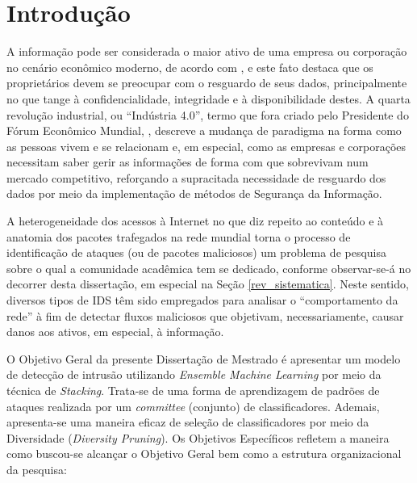 \chapter{Introdução}
\label{intro}


A informação pode ser considerada o maior ativo de uma empresa ou corporação no cenário econômico moderno, de acordo com , e este fato destaca que os proprietários devem se preocupar com o resguardo de seus dados, principalmente no que tange à confidencialidade, integridade e à disponibilidade destes. A quarta revolução industrial, ou ``Indústria 4.0'', termo que fora criado pelo Presidente do Fórum Econômico Mundial, , descreve a mudança de paradigma na forma como as pessoas vivem e se relacionam e, em especial, como as empresas e corporações necessitam saber gerir as informações de forma com que sobrevivam num mercado competitivo, reforçando a supracitada necessidade de resguardo dos dados por meio da implementação de métodos de Segurança da Informação. 

A heterogeneidade dos acessos à Internet no que diz repeito ao conteúdo e à anatomia dos pacotes trafegados na rede mundial torna o processo de identificação de ataques (ou de pacotes maliciosos) um problema de pesquisa sobre o qual a comunidade acadêmica tem se dedicado, conforme observar-se-á no decorrer desta dissertação, em especial na Seção \ref{rev_sistematica}. Neste sentido, diversos tipos de IDS têm sido empregados para analisar o ``comportamento da rede'' à fim de detectar fluxos maliciosos que objetivam, necessariamente, causar danos aos ativos, em especial, à informação.

O Objetivo Geral da presente Dissertação de Mestrado é apresentar um modelo de detecção de intrusão utilizando \textit{Ensemble Machine Learning} por meio da técnica de \textit{Stacking}. Trata-se de uma forma de aprendizagem de padrões de ataques realizada por um \textit{committee} (conjunto) de classificadores. Ademais, apresenta-se uma maneira eficaz de seleção de classificadores por meio da Diversidade (\textit{Diversity Pruning}). Os Objetivos Específicos refletem a maneira como buscou-se alcançar o Objetivo Geral bem como a estrutura organizacional da pesquisa:

